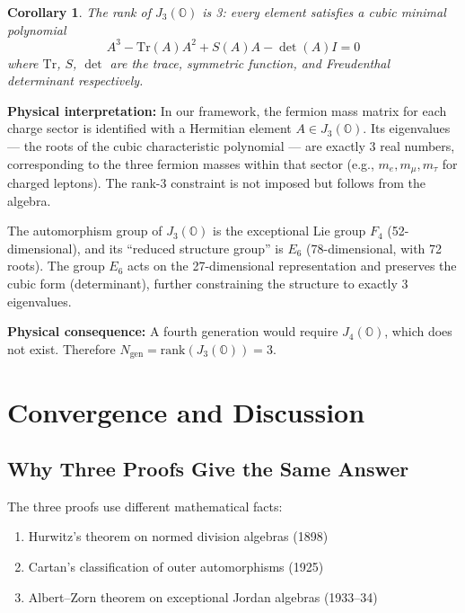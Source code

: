 \documentclass[12pt,a4paper]{article}
\newtheorem{corollary}[theorem]{Corollary}
\theoremstyle{definition}
\theoremstyle{remark}
\newcommand{\Oct}{\mathbb{O}}
\newcommand{\Tr}{\mathrm{Tr}}
\begin{document}
\begin{corollary}
The rank of $J_3(\Oct)$ is 3: every element satisfies a cubic minimal polynomial
\begin{equation}
A^3 - \Tr(A) A^2 + S(A) A - \det(A) I = 0
\end{equation}
where $\Tr$, $S$, $\det$ are the trace, symmetric function, and Freudenthal 
determinant respectively.
\end{corollary}

\textbf{Physical interpretation:} In our framework, the fermion mass matrix 
for each charge sector is identified with a Hermitian element $A \in J_3(\Oct)$. 
Its eigenvalues --- the roots of the cubic characteristic polynomial --- are 
exactly 3 real numbers, corresponding to the three fermion masses within that 
sector (e.g., $m_e, m_\mu, m_\tau$ for charged leptons). The rank-3 constraint 
is not imposed but follows from the algebra.

The automorphism group of $J_3(\Oct)$ is the exceptional Lie group $F_4$ 
(52-dimensional), and its ``reduced structure group'' is $E_6$ (78-dimensional, 
with 72 roots). The group $E_6$ acts on the 27-dimensional representation and 
preserves the cubic form (determinant), further constraining the structure to 
exactly 3 eigenvalues.

\textbf{Physical consequence:} A fourth generation would require $J_4(\Oct)$, 
which does not exist. Therefore $N_{\mathrm{gen}} = \mathrm{rank}(J_3(\Oct)) = 3$.

\section{Convergence and Discussion}
\label{sec:discussion}

\subsection{Why Three Proofs Give the Same Answer}

The three proofs use different mathematical facts:
\begin{enumerate}
\item Hurwitz's theorem on normed division algebras (1898)
\item Cartan's classification of outer automorphisms (1925)
\item Albert--Zorn theorem on exceptional Jordan algebras (1933--34)
\end{enumerate}
\end{document}
